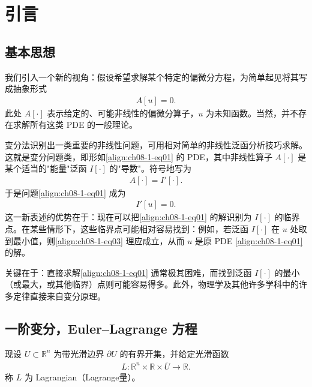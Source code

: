 \documentclass[../../main.tex]{subfiles}
\begin{document}
\section{引言}\label{section:ch08-1-引言}

\subsection{基本思想}\label{subsection:ch08-1-1-基本思想}

我们引入一个新的视角：假设希望求解某个特定的偏微分方程，为简单起见将其写成抽象形式
\begin{align}
A[u]=0.\label{align:ch08-1-eq01}
\end{align}
此处 $A[\cdot]$ 表示给定的、可能非线性的偏微分算子，$u$ 为未知函数。当然，并不存在求解所有这类 PDE 的一般理论。

变分法识别出一类重要的非线性问题，可用相对简单的非线性泛函分析技巧求解。这就是变分问题类，即形如\eqref{align:ch08-1-eq01} 的 PDE，其中非线性算子 $A[\cdot]$ 是某个适当的"能量"泛函 $I[\cdot]$ 的"导数"。符号地写为
\begin{align}
A[\cdot]=I'[\cdot].\label{align:ch08-1-eq02}
\end{align}
于是问题\eqref{align:ch08-1-eq01} 成为
\begin{align}
I'[u]=0.\label{align:ch08-1-eq03}
\end{align}
这一新表述的优势在于：现在可以把\eqref{align:ch08-1-eq01} 的解识别为 $I[\cdot]$ 的临界点。在某些情形下，这些临界点可能相对容易找到：例如，若泛函 $I[\cdot]$ 在 $u$ 处取到最小值，则\eqref{align:ch08-1-eq03} 理应成立，从而 $u$ 是原 PDE \eqref{align:ch08-1-eq01} 的解。

关键在于：直接求解\eqref{align:ch08-1-eq01} 通常极其困难，而找到泛函 $I[\cdot]$ 的最小（或最大，或其他临界）点则可能容易得多。此外，物理学及其他许多学科中的许多定律直接来自变分原理。

\subsection{一阶变分，Euler--Lagrange 方程}\label{subsection:ch08-1-2-一阶变分}

现设 $U\subset\mathbb{R}^n$ 为带光滑边界 $\partial U$ 的有界开集，并给定光滑函数
\begin{align*}
L:\mathbb{R}^n\times\mathbb{R}\times\overline{U}\to\mathbb{R}.
\end{align*}
称 $L$ 为 Lagrangian（Lagrange量）。
\end{document}
